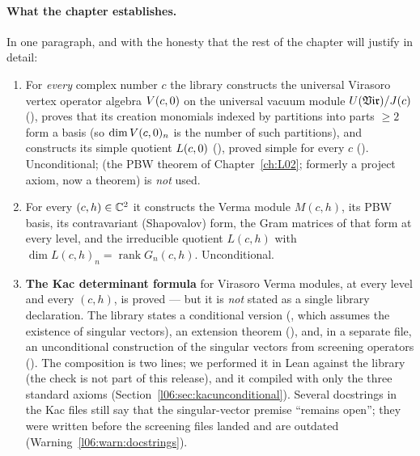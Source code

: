 \paragraph{What the chapter establishes.} In one paragraph, and with the honesty that the rest of the
chapter will justify in detail:
\begin{enumerate}
\item For \emph{every} complex number $c$ the library constructs the universal Virasoro vertex
  operator algebra $V(c,0)$ on the universal vacuum module $U(\mathfrak{Vir})/J(c)$
  (), proves that its creation monomials indexed by partitions into
  parts $\ge2$ form a basis (so $\dim V(c,0)_n$ is the number of such partitions), and constructs its
  simple quotient $L(c,0)$ (\allowbreak{}), proved simple for every $c$
  (\allowbreak{}\allowbreak{}). Unconditional;  (the PBW theorem of Chapter~\ref{ch:L02}; formerly a project axiom, now a theorem) is
  \emph{not} used.
\item For every $(c,h)\in{\mathbb{C}}^2$ it constructs the Verma module $M(c,h)$, its PBW basis, its
  contravariant (Shapovalov) form, the Gram matrices of that form at every level, and the irreducible
  quotient $L(c,h)$ with $\dim L(c,h)_n = \operatorname{rank}G_n(c,h)$. Unconditional.
\item \textbf{The Kac determinant formula} for Virasoro Verma modules, at every level and every
  $(c,h)$, is proved --- but it is \emph{not} stated as a single library declaration. The library
  states a conditional version (\allowbreak{}\allowbreak{}\allowbreak{}\allowbreak{}, which assumes the
  existence of singular vectors), an extension theorem (\allowbreak{}\allowbreak{}\allowbreak{}\allowbreak{}\allowbreak{}), and,
  in a separate file, an unconditional construction of the singular vectors from screening operators
  (\allowbreak{}\allowbreak{}\allowbreak{}). The composition is two lines; we performed it in Lean against the
  library (the check is not part of this release), and it
  compiled with only the three standard axioms (Section~\ref{l06:sec:kacunconditional}). Several
  docstrings in the Kac files still say that the singular-vector premise ``remains open''; they were
  written before the screening files landed and are outdated (Warning~\ref{l06:warn:docstrings}).

\end{enumerate}
